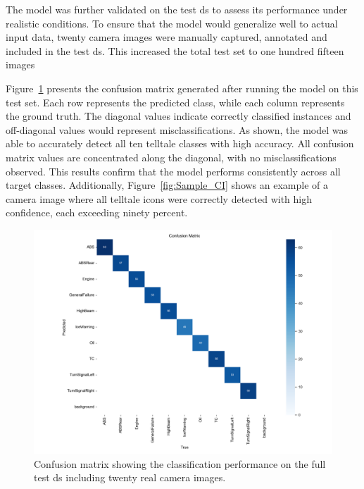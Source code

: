 The model was further validated on the test \gls{ds} to assess its performance under realistic conditions. To ensure that the model would generalize well to actual input data, twenty camera images were manually captured, annotated and included in the test \gls{ds}. This increased the total test set to one hundred fifteen images

Figure~\ref{fig:conf_matrix} presents the confusion matrix generated after running the model on this test set. Each row represents the predicted class, while each column represents the ground truth. The diagonal values indicate correctly classified instances and off-diagonal values would represent misclassifications. As shown, the model was able to accurately detect all ten telltale classes with high accuracy. All confusion matrix values are concentrated along the diagonal, with no misclassifications observed. This results confirm that the model performs consistently across all target classes. Additionally, Figure~\ref{fig:Sample_CI} shows an example of a camera image where all telltale icons were correctly detected with high confidence, each exceeding ninety percent.

\begin{figure}[!ht]
    \centering
    \includegraphics[width=1\textwidth]{Figures/Results/Graphs/Test/confusion_matrix.png}
    \caption{Confusion matrix showing the classification performance on the full test \gls{ds} including twenty real camera images.}
    \label{fig:conf_matrix}
\end{figure}


